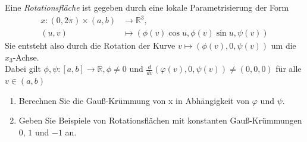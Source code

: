 \begin{assignment}
  Eine \emph{Rotationsfläche} ist gegeben durch eine lokale Parametrisierung der Form
  \begin{align*}
    x:(0,2\pi) \times (a,b) &\to \mathbb{R}^3, \\
    (u,v) &\mapsto (\phi(v)\cos u, \phi(v)\sin u, \psi(v))
  \end{align*}
  Sie entsteht also durch die Rotation der Kurve \( v \mapsto (\phi(v), 0, \psi(v)) \) um die \( x_3 \)-Achse. \\
  Dabei gilt \( \phi, \psi: [a,b] \to \mathbb{R}, \phi \neq 0 \) und \( \frac{d}{dv}(\varphi(v), 0, \psi(v)) \neq (0,0,0) \) für alle \( v \in (a,b) \)
  \begin{enumerate}[label= (\alph*)] 
    \item Berechnen Sie die Gauß-Krümmung von x in Abhängigkeit von \( \varphi \) und \( \psi \). 
    \item Geben Sie Beispiele von Rotationsflächen mit konstanten Gauß-Krümmungen \( 0 \), \( 1 \) und \( -1 \) an.
  \end{enumerate}
\end{assignment}
